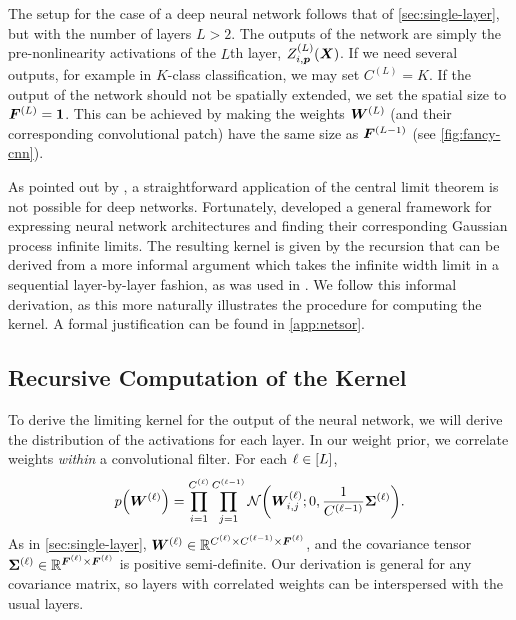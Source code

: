 \documentclass[accepted]{uai2021} %
\newcommand{\layerAs}[2]{Z^{(#1)}_{#2}(\vX)}
\newcommand{\layerC}[1]{C^{(#1)}}
\newcommand{\layerW}[1]{\mW^{(#1)}}
\newcommand{\layersizebase}{\vF}
\newcommand{\layersize}[1]{{\layersizebase^{\bra{#1}}}}
\newcommand{\priorWcovs}[1]{\Sigma^{(#1)}}
\newcommand{\priorWcov}[1]{\boldsymbol{\Sigma}^{(#1)}}
\newcommand{\chan}{i}
\newcommand{\prevchan}{j}   %
\newcommand{\patch}{\vp}               %
\newcommand{\0}{\boldsymbol{0}}
\newcommand{\1}{\boldsymbol{1}}
\begin{document}
The setup for the case of a deep neural network follows that of \cref{sec:single-layer}, but with the number of layers $L>2$. The outputs of the network are simply the pre-nonlinearity activations of the $L$th layer, $\layerAs{L}{\chan,\patch}$. If we need several outputs, for example in $K$-class classification, we may set $\layerC{L}=K.$
If the output of the network should not be spatially extended, we set the spatial size to $\layersize{L}=\1$. This can be achieved by making the weights $\layerW{L}$ (and their corresponding convolutional patch) have the same size as $\layersize{L-1}$ (see \cref{fig:fancy-cnn}).

As pointed out by \citet{matthews2018dnnlimit}, a straightforward application of the central limit theorem is not possible for deep networks. Fortunately, \citet{yang2019wide} developed a general framework for expressing neural network architectures and finding their corresponding Gaussian process infinite limits. The resulting kernel is given by the recursion that can be derived from a more informal argument which takes the infinite width limit in a sequential layer-by-layer fashion, as was used in \citet{garriga2018infiniteconv}. We follow this informal derivation, as this more naturally illustrates the procedure for computing the kernel. A formal justification can be found in \cref{app:netsor}.

\subsection{Recursive Computation of the Kernel}
To derive the limiting kernel for the output of the neural network, we will derive the distribution of the activations for each layer. In our weight prior, we correlate weights \emph{within} a convolutional filter. For each $\ell \in [L]$,
\begin{equation}
  p\bra{\layerW{\ell}} = \prod_{\chan=1}^{\layerC{\ell}}\prod_{\prevchan=1}^{\layerC{\ell-1}}
  \Normal{\layerW{\ell}_{\chan,\prevchan}; 0, \frac{1}{\layerC{\ell-1}} \priorWcov{\ell}}.
    \label{eq:correlated-weight-prior}
\end{equation}
As in \cref{sec:single-layer}, $\layerW{\ell} \in \sR^{\layerC{\ell}\times\layerC{\ell-1}\times\layersize{\ell}}$, and the covariance tensor $\priorWcov{\ell} \in \sR^{\layersize{\ell}\times\layersize{\ell}}$ is positive semi-definite.
Our derivation is general for any covariance matrix, so layers with correlated weights can be interspersed with the usual layers.
\end{document}
